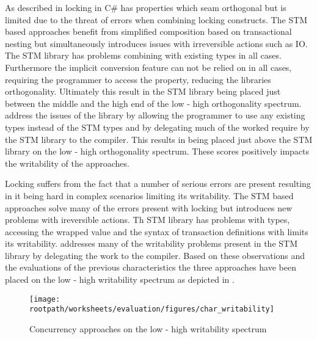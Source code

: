 As described in  locking in C\# has properties which seam orthogonal but is limited due to the threat of errors when combining locking constructs. The \ac{STM} based approaches benefit from simplified composition based on transactional nesting but simultaneously introduces issues with irreversible actions such as \ac{IO}. The \ac{STM} library has problems combining with existing types in all cases. Furthermore the implicit conversion feature can not be relied on in all cases, requiring the programmer to access the  property, reducing the libraries orthogonality. Ultimately this result in the \ac{STM} library being placed just between the middle and the high end of the low - high orthogonality spectrum. \stmname address the issues of the  library by allowing the programmer to use any existing types instead of the \ac{STM} types and by delegating much of the worked require by the \ac{STM} library to the compiler. This results in \stmname being placed just above the \ac{STM} library on the  low - high orthogonality spectrum. These scores positively impacts the writability of the approaches.

Locking suffers from the fact that a number of serious errors are present resulting in it being hard in complex scenarios limiting its writability. The \ac{STM} based approaches solve many of the errors present with locking but introduces new problems with ireversible actions. Th \ac{STM} library has problems with types, accessing the wrapped value and the syntax of transaction definitions with limits its writability. \stmname addresses many of the writability problems present in the \ac{STM} library by delegating the work to the compiler. Based on these observations and the evaluations of the previous characteristics the three approaches have been placed on the low - high writability spectrum as depicted in .

\begin{figure}[htbp]
\centering
 \texttt{[image: \\rootpath/worksheets/evaluation/figures/char\_writability]} 
 \caption{Concurrency approaches on the low - high writability spectrum}
\label{fig:char_tl_writability}
\end{figure}

\worksheetend
